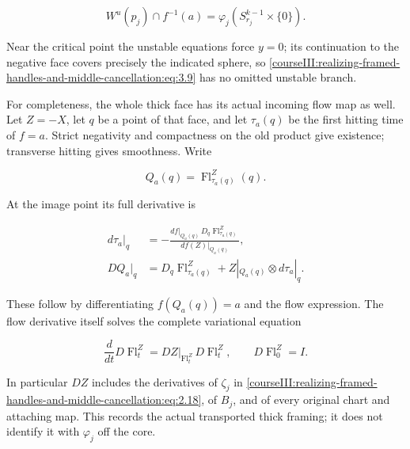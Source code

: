 \begin{equation}
W^u(p_j)\cap f^{-1}(a)
   =\varphi_j(S^{k-1}_{r_j}\times\{0\}).
 \label{courseIII:realizing-framed-handles-and-middle-cancellation:eq:3.9}
\end{equation}

Near the critical point the unstable equations force \(y=0\); its continuation to the negative face covers precisely the indicated sphere, so \eqref{courseIII:realizing-framed-handles-and-middle-cancellation:eq:3.9} has no omitted unstable branch.

For completeness, the whole thick face has its actual incoming flow map as well. Let \(Z=-X\), let \(q\) be a point of that face, and let \(\tau_a(q)\) be the first hitting time of \(f=a\). Strict negativity and compactness on the old product give existence; transverse hitting gives smoothness. Write

\begin{equation}
Q_a(q)=\operatorname{Fl}^{Z}_{\tau_a(q)}(q).
 \label{courseIII:realizing-framed-handles-and-middle-cancellation:eq:3.10}
\end{equation}

At the image point its full derivative is

\begin{equation}
\begin{aligned}
 d\tau_a|_q
  &=-\frac{df|_{Q_a(q)}\,D_q\operatorname{Fl}^{Z}_{\tau_a(q)}}
                {df(Z)|_{Q_a(q)}},\\
 DQ_a|_q
  &=D_q\operatorname{Fl}^{Z}_{\tau_a(q)}
                 +Z|_{Q_a(q)}\otimes d\tau_a|_q .
 \end{aligned}
 \label{courseIII:realizing-framed-handles-and-middle-cancellation:eq:3.11}
\end{equation}

These follow by differentiating \(f(Q_a(q))=a\) and the flow expression. The flow derivative itself solves the complete variational equation

\begin{equation}
\frac{d}{dt}D\operatorname{Fl}^{Z}_t
    =DZ|_{\operatorname{Fl}^{Z}_t}\,D\operatorname{Fl}^{Z}_t,
 \qquad D\operatorname{Fl}^{Z}_0=I.
 \label{courseIII:realizing-framed-handles-and-middle-cancellation:eq:3.12}
\end{equation}

In particular \(DZ\) includes the derivatives of \(\zeta_j\) in \eqref{courseIII:realizing-framed-handles-and-middle-cancellation:eq:2.18}, of \(B_j\), and of every original chart and attaching map. This records the actual transported thick framing; it does not identify it with \(\varphi_j\) off the core.

